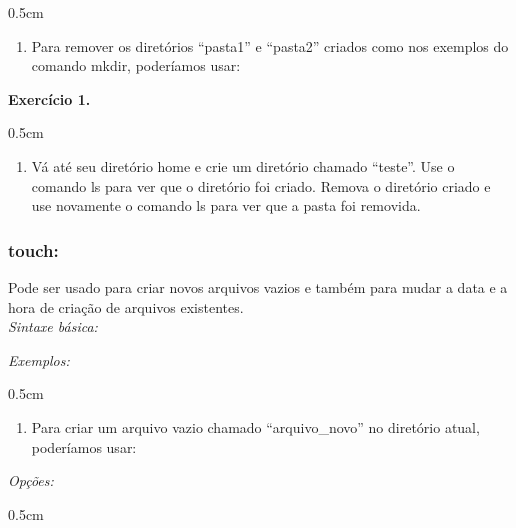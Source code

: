 \begin{refsection}
\begin {myindentpar}{0.5cm}
\begin{enumerate}[\itshape i.]
 \item{Para remover os diretórios ``pasta1'' e ``pasta2'' criados como nos exemplos do comando mkdir, poderíamos usar:}


\end{enumerate}
\end{myindentpar}

\begin{blackBlock}{\textbf{Exercício 1.}}\label{tut1:ex:1.\arabic{ex}}

\begin {myindentpar}{0.5cm}
\begin{enumerate}[\itshape i.]
 \item{Vá até seu diretório home e crie um diretório chamado ``teste''. Use o comando ls para ver que o diretório foi criado. Remova o diretório criado e use novamente o comando ls para ver que a pasta foi removida.}
\end{enumerate}
\end{myindentpar}

\end{blackBlock}

\subsubsection{touch:}\label{tut1:text_mode:commands:touch}

 Pode ser usado para criar novos arquivos vazios e também para mudar a data e a hora de criação de arquivos existentes.
\\
\textit{Sintaxe básica:}


\textit{Exemplos:}
 \begin {myindentpar}{0.5cm}
 \begin{enumerate}[\itshape i.]

 \item{Para criar um arquivo vazio chamado ``arquivo\_novo'' no diretório atual, poderíamos usar:}

 
 \end{enumerate}
 \end{myindentpar}

\textit{Opções:}
 \begin {myindentpar}{0.5cm}
 \begin{enumerate}[\itshape i.]


\end{enumerate}
\end{myindentpar}
\end{refsection}
